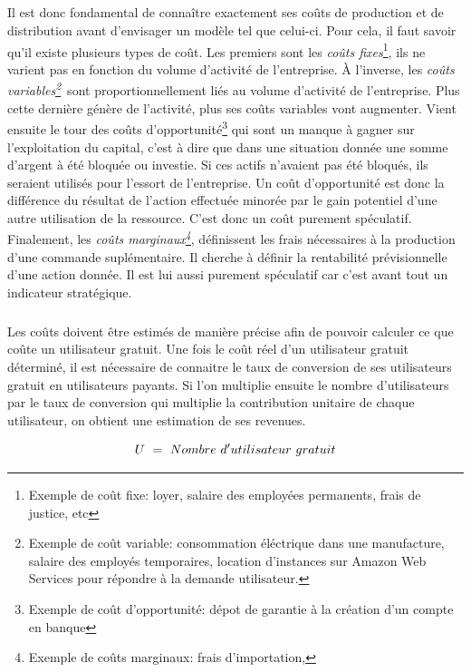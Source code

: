 \documentclass[11pt, a4paper ]{article}
\begin{document}
\begin{spacing}{1.5}
\subparagraph{}
Il est donc fondamental de connaître exactement ses coûts de production et de distribution avant d'envisager un modèle tel que celui-ci. Pour cela, il faut savoir qu'il existe plusieurs types de coût.
Les premiers sont les \emph{coûts fixes}\footnote{Exemple de coût fixe: loyer, salaire des employées permanents, frais de justice, etc}\cite{defCoutFixeEtVar}, ils ne varient pas en fonction du volume d'activité de l'entreprise.
À l'inverse, les \emph{coûts variables\footnote{Exemple de coût variable: consommation éléctrique dans une manufacture, salaire des employés temporaires, location d'instances sur Amazon Web Services pour répondre à la demande utilisateur.}\cite{defCoutFixeEtVar}}\ sont proportionnellement liés au volume d'activité de l'entreprise. Plus cette dernière génère de l'activité, plus ses coûts variables vont augmenter.
Vient ensuite le tour des coûts d'opportunité\footnote{Exemple de coût d'opportunité: dépot de garantie à la création d'un compte en banque }\cite{defCoutOpp} qui sont un manque à gagner sur l'exploitation du capital, c'est à dire que dans une situation donnée une somme d'argent à été bloquée ou investie. Si ces actifs n'avaient pas été bloqués, ils seraient utilisés pour l'essort de l'entreprise. Un coût d'opportunité est donc la différence du résultat de l'action effectuée minorée par le gain potentiel d'une autre utilisation de la ressource. C'est donc un coût purement spéculatif.
Finalement, les \emph{coûts marginaux\footnote{Exemple de coûts marginaux: frais d'importation, }}, définissent les frais nécessaires à la production d'une commande suplémentaire. Il cherche à définir la rentabilité prévisionnelle d'une action donnée. Il est lui aussi purement spéculatif car c'est avant tout un indicateur stratégique.
\subparagraph{}
Les coûts doivent être estimés de manière précise afin de pouvoir calculer ce que coûte un utilisateur gratuit. Une fois le coût réel d'un utilisateur gratuit déterminé, il est nécessaire de connaitre le taux de conversion de ses utilisateurs gratuit en utilisateurs payants. Si l'on multiplie ensuite le nombre d'utilisateurs par le taux de conversion qui multiplie la contribution unitaire de chaque utilisateur, on obtient une estimation de ses revenues\cite{équationFreemium}.

\begin{equation}\index{U!définition}
	U\ =\ Nombre\ d'utilisateur\ gratuit
\end{equation}



\end{spacing}
\end{document}
